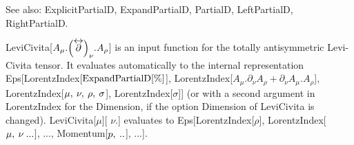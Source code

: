 See also:  ExplicitPartialD, ExpandPartialD, PartialD, LeftPartialD, RightPartialD.


\dispSFinmath{
\mu 
}

\dispSFoutmath{
\mu 
}

\dispSFinmath{
\mu 
}


\dispSFinmath{
{{\left( \overvar{\partial }{\leftrightarrow } \right) }_{\mu }}
}


\dispSFinmath{
{{\left( \overvar{\partial }{\leftarrow } \right) }_{\mu }}+{{\left( \overvar{\partial }{\rightarrow } \right) }_{\mu }}
}








LeviCivita[\({A_{\mu }}.{{\left( \overvar{\partial }{\leftrightarrow } \right) }_{\nu }}.{A_{\rho }}\)] is an input function for the totally antisymmetric
Levi-Civita tensor. It evaluates automatically to the internal representation
  Eps[LorentzIndex[\(\mathrm{ExpandPartialD}[\%]\)], LorentzIndex[\({A_{\mu }}.{{\partial }_{\nu }}A_{\rho }^{ }+{{\partial }_{\nu }}A_{\mu
}^{ }.{A_{\rho }}\)], LorentzIndex[\(\mu ,\> \nu ,\> \rho ,\> \sigma \)], LorentzIndex[\(\sigma \)]] (or with a second argument
in LorentzIndex for the Dimension, if the option Dimension of LeviCivita is
  changed). LeviCivita[\(\mu \)][ \(\nu \).] evaluates to Eps[LorentzIndex[\(\rho \)], LorentzIndex[\(\mu ,\> \nu \> ...\)], ..., Momentum[\(p,\>
..\)], ...].

